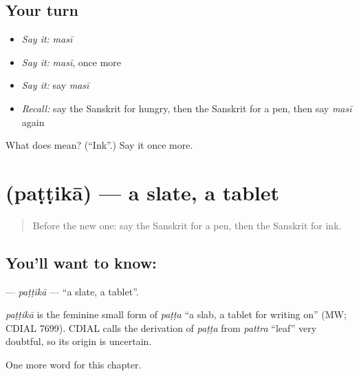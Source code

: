 \subsection*{Your turn}
\begin{itemize}
\raggedright
  \item \emph{Say it:} \emph{masī}
  \item \emph{Say it:} \emph{masī}, once more
  \item \emph{Say it:} say \emph{masī}
  \item \emph{Recall:} say the Sanskrit for hungry, then the Sanskrit for a pen, then say \emph{masī} again
\end{itemize}

\begin{tcolorbox}[breakable,colback=teal!4,colframe=teal!35!black,title={Before you move on}]
What does  mean? (\textquotedblleft{}Ink\textquotedblright{}.) Say it once more.
\end{tcolorbox}
\section[\texorpdfstring{\sk{पट्टिका} (paṭṭikā)}{पट्टिका (paṭṭikā)}]{ (paṭṭikā) — a slate, a tablet}

\label{lesson:SA-C158-pattika}



\begin{quote}
Before the new one: say the Sanskrit for a pen, then the Sanskrit for ink.
\end{quote}

\subsection*{You'll want to know: }
\textbf{} — \emph{paṭṭikā} — \textquotedblleft{}a slate, a tablet\textquotedblright{}.

\begin{cousinweb}
\emph{paṭṭikā} is the feminine small form of \emph{paṭṭa} \textquotedblleft{}a slab, a tablet for writing on\textquotedblright{} (MW; CDIAL 7699). CDIAL calls the derivation of \emph{paṭṭa} from \emph{pattra} \textquotedblleft{}leaf\textquotedblright{} very doubtful, so its origin is uncertain.
\end{cousinweb}

\begin{grammarlens}[title={What you've built}]
One more word for this chapter.
\end{grammarlens}


